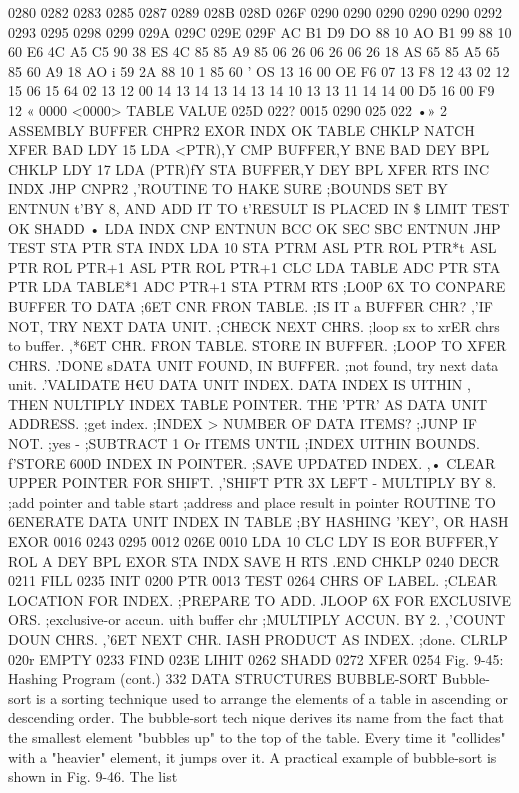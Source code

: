 \documentclass{book}
\begin{document}
{{{{{{{{{{{{{{{{{{{{{{{{{{{{{{{{{{{{{{{{{{{{{{{{{{{{{{{{{{{{{{{{{{{{{{{{{{{{{{{{{{{{{{{{{{{{0280
0282
0283
0285
0287
0289
028B
028D
026F
0290
0290
0290
0290
0290
0292
0293
0295
0298
0299
029A
029C
029E
029F
AC
B1
D9
DO
88
10
AO
B1
99
88
10
60
E6
4C
A5
C5
90
38
ES
4C
85
85
A9
85
06
26
06
26
06
26
18
AS
65
85
A5
65
85
60
A9
18
AO i
59
2A
88
10 1
85
60
' OS
13
16 00
OE
F6
07
13
F8
12
43 02
12
15
06
15
64 02
13
12
00
14
13
14
13
14
13
14
10
13
13
11
14
14
00
D5
16 00
F9
12
« 0000 <0000>
TABLE
VALUE
025D
022?
0015
0290
025
022
•»
2
ASSEMBLY
BUFFER
CHPR2
EXOR
INDX
OK
TABLE
CHKLP
NATCH
XFER
BAD
LDY 15
LDA <PTR),Y
CMP BUFFER,Y
BNE BAD
DEY
BPL CHKLP
LDY 17
LDA (PTR)fY
STA BUFFER,Y
DEY
BPL XFER
RTS
INC INDX
JHP CNPR2
,'ROUTINE TO HAKE SURE
;BOUNDS SET BY ENTNUN
t'BY 8, AND ADD IT TO
t'RESULT IS PLACED IN
\$
LIMIT
TEST
OK
SHADD
•
LDA INDX
CNP ENTNUN
BCC OK
SEC
SBC ENTNUN
JHP TEST
STA PTR
STA INDX
LDA 10
STA PTRM
ASL PTR
ROL PTR*t
ASL PTR
ROL PTR+1
ASL PTR
ROL PTR+1
CLC
LDA TABLE
ADC PTR
STA PTR
LDA TABLE*1
ADC PTR+1
STA PTRM
RTS
;LO0P 6X TO CONPARE BUFFER TO DATA
;6ET CNR FRON TABLE.
;IS IT a BUFFER CHR?
,'IF NOT, TRY NEXT DATA UNIT.
;CHECK NEXT CHRS.
;loop sx to xrER chrs to buffer.
,*6ET CHR. FRON TABLE.
{STORE IN BUFFER.
;LOOP TO XFER CHRS.
.'DONE sDATA UNIT FOUND, IN BUFFER.
;not found, try next data unit.
.'VALIDATE H€U DATA UNIT INDEX.
DATA INDEX IS UITHIN
, THEN NULTIPLY INDEX
TABLE POINTER. THE
'PTR' AS DATA UNIT ADDRESS.
;get index.
;INDEX > NUMBER OF DATA ITEMS?
;JUNP IF NOT.
;yes -
;SUBTRACT 1 Or ITEMS UNTIL
;INDEX UITHIN BOUNDS.
f'STORE 600D INDEX IN POINTER.
;SAVE UPDATED INDEX.
,• CLEAR UPPER POINTER FOR SHIFT.
,'SHIFT PTR 3X LEFT - MULTIPLY BY 8.
;add pointer and table start
;address and place result in pointer
{ROUTINE TO 6ENERATE DATA UNIT INDEX IN TABLE
;BY HASHING 'KEY', OR
HASH
EXOR
0016
0243
0295
0012
026E
0010
LDA 10
CLC
LDY IS
EOR BUFFER,Y
ROL A
DEY
BPL EXOR
STA INDX SAVE H
RTS
.END
CHKLP 0240
DECR 0211
FILL 0235
INIT 0200
PTR 0013
TEST 0264
CHRS OF LABEL.
;CLEAR LOCATION FOR INDEX.
;PREPARE TO ADD.
JLOOP 6X FOR EXCLUSIVE ORS.
;exclusive-or accun. uith buffer chr
;MULTIPLY ACCUN. BY 2.
,'COUNT DOUN CHRS.
,'6ET NEXT CHR.
IASH PRODUCT AS INDEX.
;done.
CLRLP 020r
EMPTY 0233
FIND 023E
LIHIT 0262
SHADD 0272
XFER 0254
Fig. 9-45: Hashing Program (cont.)
332
DATA STRUCTURES
BUBBLE-SORT
Bubble-sort is a sorting technique used to arrange the elements
of a table in ascending or descending order. The bubble-sort tech
nique derives its name from the fact that the smallest element
"bubbles up" to the top of the table. Every time it "collides" with
a "heavier" element, it jumps over it.
A practical example of bubble-sort is shown in Fig. 9-46. The list
}}}}}}}}}}}}}}}}}}}}}}}}}}}}}}}}}}}}}}}}}}}}}}}}}}}}}}}}}}}}}}}}}}}}}}}}}}}}}}}}}}}}}}}}}}}}}}
\end{document}
